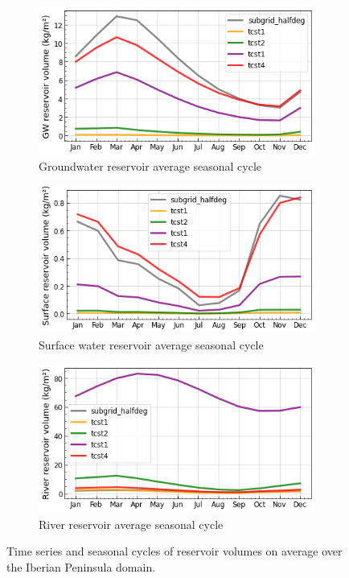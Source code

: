 \begin{figure}[htbp]
    \begin{subfigure}[b]{0.32\textwidth}
        \caption{Groundwater reservoir average seasonal cycle}
        \includegraphics[width=\linewidth]{images/chap3/time_series/slowr_seasonal_cycle_tcsts.png}
    \end{subfigure}
    \begin{subfigure}[b]{0.32\textwidth}
        \caption{Surface water reservoir average seasonal cycle}
        \includegraphics[width=\linewidth]{images/chap3/time_series/fastr_seasonal_cycle_tcsts.png}
    \end{subfigure}
    \begin{subfigure}[b]{0.32\textwidth}
        \caption{River reservoir average seasonal cycle}
        \includegraphics[width=\linewidth]{images/chap3/time_series/streamr_seasonal_cycle_tcsts.png}
    \end{subfigure}
    \caption{Time series and seasonal cycles of reservoir volumes on average over the Iberian Peninsula domain.}
    \label{fig:reservoir_time_series_tcsts}
\end{figure}

